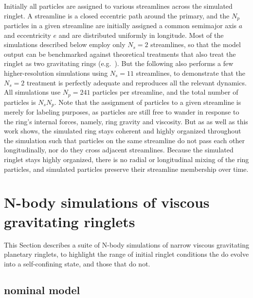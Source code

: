 \documentclass[preprint]{aastex62}
\begin{document}
Initially all particles are assigned to various streamlines across the simulated ringlet. A streamline
is a closed eccentric path around the primary, and the $N_p$ particles in a given
streamline are initially assigned a common semimajor axis $a$ and eccentricity $e$ and are
distributed uniformly in longitude. Most of the simulations described below
employ only $N_s=2$ streamlines, so that the model output can be benchmarked against
theoretical treatments that also treat the ringlet as two gravitating rings
(e.g.\ \citealt{BGT83}). But the following also performs a few higher-resolution simulations
using $N_s=11$ streamlines, to demonstrate that the $N_s=2$ treatment is perfectly
adequate and reproduces all the relevant dynamics. All simulations use $N_p=241$ particles 
per streamline, and the total number of particles is $N_sN_p$.
Note that the assignment of particles to a given streamline is merely
for labeling purposes, as particles are still free to wander in response
to the ring’s internal forces, namely, ring gravity and viscosity. But as \cite{HS13} as well
as this work shows, the simulated ring stays coherent and highly organized throughout the 
simulation such that particles on the same streamline do not pass each other longitudinally,
nor do they cross adjacent streamlines. Because the simulated ringlet stays highly organized,
there is no radial or longitudinal mixing of the ring particles, and simulated particles preserve
their streamline membership over time.


\section{N-body simulations of viscous gravitating ringlets}
\label{sec:nbody}

This Section describes a suite of N-body simulations of narrow viscous gravitating planetary
ringlets, to highlight the range of initial ringlet conditions the do evolve into
a self-confining state, and those that do not.

\subsection{nominal model}
\label{subsec:nominal}
\end{document}
